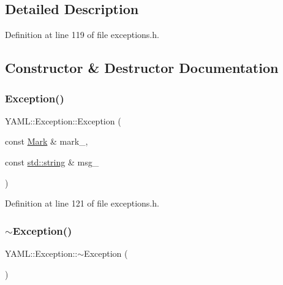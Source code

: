 \subsection{Detailed Description}


Definition at line 119 of file exceptions.\+h.



\subsection{Constructor \& Destructor Documentation}
\mbox{\label{class_y_a_m_l_1_1_exception_a6f03669b679e99bb51ee69a562ed7d77}} 
\subsubsection{\texorpdfstring{Exception()}{Exception()}\hspace{0.1cm}{\footnotesize\ttfamily [1/2]}}
{\footnotesize\ttfamily Y\+A\+M\+L\+::\+Exception\+::\+Exception (\begin{DoxyParamCaption}\item[{const \mbox{\hyperlink{struct_y_a_m_l_1_1_mark}{Mark}} \&}]{mark\+\_\+,  }\item[{const \mbox{\hyperlink{glad_8h_ac83513893df92266f79a515488701770}{std\+::string}} \&}]{msg\+\_\+ }\end{DoxyParamCaption})\hspace{0.3cm}{\ttfamily [inline]}}



Definition at line 121 of file exceptions.\+h.

\mbox{\label{class_y_a_m_l_1_1_exception_ae2964297ac5df854a9df0b4de255f86c}} 
\subsubsection{\texorpdfstring{$\sim$Exception()}{~Exception()}}
{\footnotesize\ttfamily Y\+A\+M\+L\+::\+Exception\+::$\sim$\+Exception (\begin{DoxyParamCaption}{ }\end{DoxyParamCaption})\hspace{0.3cm}{\ttfamily [virtual]}}




